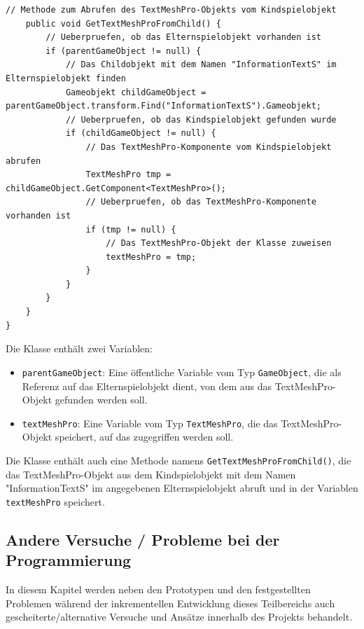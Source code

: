 \begin{itemize}
\begin{lstlisting}[style=csharp, caption={Kind vom Gameobjekt bekommen}, label=code:]
    // Methode zum Abrufen des TextMeshPro-Objekts vom Kindspielobjekt
    public void GetTextMeshProFromChild() {
        // Ueberpruefen, ob das Elternspielobjekt vorhanden ist
        if (parentGameObject != null) {
            // Das Childobjekt mit dem Namen "InformationTextS" im Elternspielobjekt finden
            Gameobjekt childGameObject = parentGameObject.transform.Find("InformationTextS").Gameobjekt;
            // Ueberpruefen, ob das Kindspielobjekt gefunden wurde
            if (childGameObject != null) {
                // Das TextMeshPro-Komponente vom Kindspielobjekt abrufen
                TextMeshPro tmp = childGameObject.GetComponent<TextMeshPro>();
                // Ueberpruefen, ob das TextMeshPro-Komponente vorhanden ist
                if (tmp != null) {
                    // Das TextMeshPro-Objekt der Klasse zuweisen
                    textMeshPro = tmp;
                }
            }
        }
    }
}
    \end{lstlisting}
    Die Klasse enthält zwei Variablen:

    \begin{itemize}
        \item \texttt{parentGameObject}: Eine öffentliche Variable vom Typ \texttt{GameObject}, die als Referenz auf das Elternspielobjekt dient, von dem aus das TextMeshPro-Objekt gefunden werden soll.
        \item \texttt{textMeshPro}: Eine Variable vom Typ \texttt{TextMeshPro}, die das TextMeshPro-Objekt speichert, auf das zugegriffen werden soll.
    \end{itemize}

    Die Klasse enthält auch eine Methode namens \texttt{GetTextMeshProFromChild()}, die das TextMeshPro-Objekt aus dem Kindspielobjekt mit dem Namen "InformationTextS" im angegebenen Elternspielobjekt abruft und in der Variablen \texttt{textMeshPro} speichert.

    \subsection{Andere Versuche / Probleme bei der Programmierung}
    In diesem Kapitel werden neben den Prototypen und den festgestellten Problemen während der inkrementellen Entwicklung dieses Teilbereichs auch gescheiterte/alternative Versuche und Ansätze innerhalb des Projekts behandelt.



\end{itemize}
